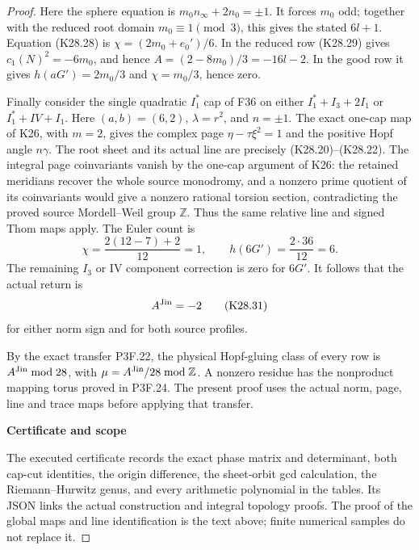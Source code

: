 \begin{proof}
Here the sphere equation is \(m_0n_\infty+2n_0=\pm1\).
It forces \(m_0\) odd; together with the reduced root domain
\(m_0\equiv1\pmod3\), this gives the stated \(6l+1\).
Equation (K28.28) is \(\chi=(2m_0+e_0')/6\).
In the reduced row (K28.29) gives
\(c_1(N)^2=-6m_0\), and hence
\(A=(2-8m_0)/3=-16l-2\). In the good row it gives
\(h(aG')=2m_0/3\) and \(\chi=m_0/3\), hence zero.

Finally consider the single quadratic \(I_1^*\) cap of F36
on either \(I_1^*+I_3+2I_1\) or \(I_1^*+IV+I_1\).
Here \((a,b)=(6,2)\), \(\lambda=r^2\), and \(n=\pm1\).
The exact one-cap map of K26, with \(m=2\), gives the complex
page \(\eta-\tau\xi^2=1\) and the positive Hopf angle \(n\gamma\).
The root sheet and its actual line are precisely (K28.20)--(K28.22).
The integral page coinvariants vanish by the one-cap argument
of K26: the retained meridians recover the whole source
monodromy, and a nonzero prime quotient of its coinvariants
would give a nonzero rational torsion section, contradicting
the proved source Mordell--Weil group \(\mathbb Z\).
Thus the same relative line and signed Thom maps apply.
The Euler count is
\[
              \chi=\frac{2(12-7)+2}{12}=1,\qquad
              h(6G')=\frac{2\cdot36}{12}=6 .
\]
The remaining \(I_3\) or IV component correction is zero for
\(6G'\). It follows that the actual return is
\[
                       A^{\rm Jin}=-2
 \tag{K28.31}
\]
for either norm sign and for both source profiles.

By the exact transfer P3F.22, the physical Hopf-gluing class of
every row is \(A^{\rm Jin}\bmod28\), with
\(\mu=A^{\rm Jin}/28\bmod\mathbb Z\). A nonzero residue has the
nonproduct mapping torus proved in P3F.24. The present proof
uses the actual norm, page, line and trace maps before applying
that transfer.

\par

\medskip\noindent\textbf{Certificate and scope}

\par\nobreak

The executed certificate  records
the exact phase matrix and determinant, both cap-cut identities,
the origin difference, the sheet-orbit gcd calculation, the
Riemann--Hurwitz genus, and every arithmetic polynomial in the
tables. Its JSON links the actual construction and integral topology
proofs. The proof of the global maps and line identification is
the text above; finite numerical samples do not replace it.
\end{proof}

